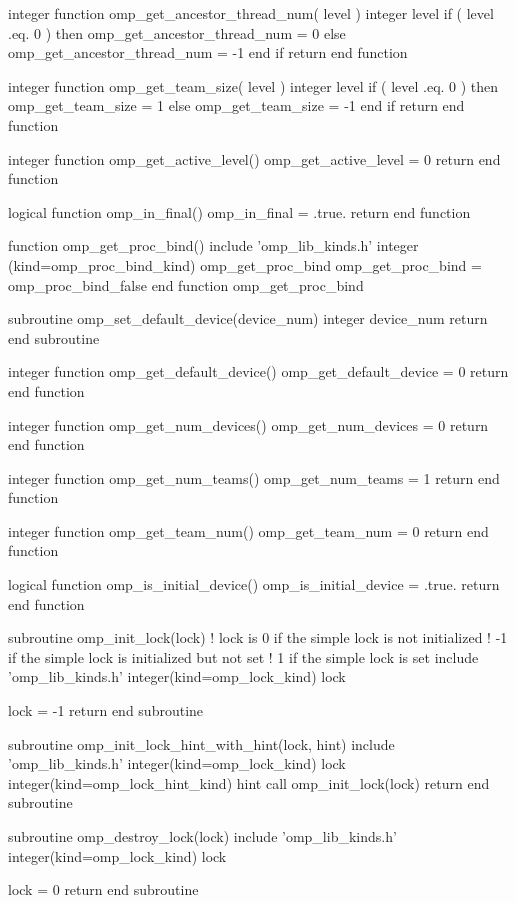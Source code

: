 {\begin{codepar}
integer function omp\_get\_ancestor\_thread\_num( level )
  integer level
  if ( level .eq. 0 ) then
     omp\_get\_ancestor\_thread\_num = 0
  else
     omp\_get\_ancestor\_thread\_num = -1
  end if
  return
end function

integer function omp\_get\_team\_size( level )
  integer level
  if ( level .eq. 0 ) then
     omp\_get\_team\_size = 1
  else
     omp\_get\_team\_size = -1
  end if
  return
end function

integer function omp\_get\_active\_level()
  omp\_get\_active\_level = 0
  return
end function

logical function omp\_in\_final()
  omp\_in\_final = .true.
  return
end function

function omp\_get\_proc\_bind()
  include 'omp\_lib\_kinds.h'
  integer (kind=omp\_proc\_bind\_kind) omp\_get\_proc\_bind
  omp\_get\_proc\_bind = omp\_proc\_bind\_false
end function omp\_get\_proc\_bind

subroutine omp\_set\_default\_device(device\_num)
  integer device\_num
  return
end subroutine

integer function omp\_get\_default\_device()
  omp\_get\_default\_device = 0
  return
end function

integer function omp\_get\_num\_devices()
  omp\_get\_num\_devices = 0
  return
end function

integer function omp\_get\_num\_teams()
  omp\_get\_num\_teams = 1
  return
end function

integer function omp\_get\_team\_num()
  omp\_get\_team\_num = 0
  return
end function

logical function omp\_is\_initial\_device()
  omp\_is\_initial\_device = .true.
  return
end function

subroutine omp\_init\_lock(lock)
  ! lock is 0 if the simple lock is not initialized
  !        -1 if the simple lock is initialized but not set
  !         1 if the simple lock is set
  include 'omp\_lib\_kinds.h'
  integer(kind=omp\_lock\_kind) lock

  lock = -1
  return
end subroutine

subroutine omp\_init\_lock\_hint\_with\_hint(lock, hint)
  include 'omp\_lib\_kinds.h'
  integer(kind=omp\_lock\_kind) lock
  integer(kind=omp\_lock\_hint\_kind) hint
  call omp\_init\_lock(lock)
  return
end subroutine

subroutine omp\_destroy\_lock(lock)
  include 'omp\_lib\_kinds.h'
  integer(kind=omp\_lock\_kind) lock

  lock = 0
  return
end subroutine


\end{codepar}}
